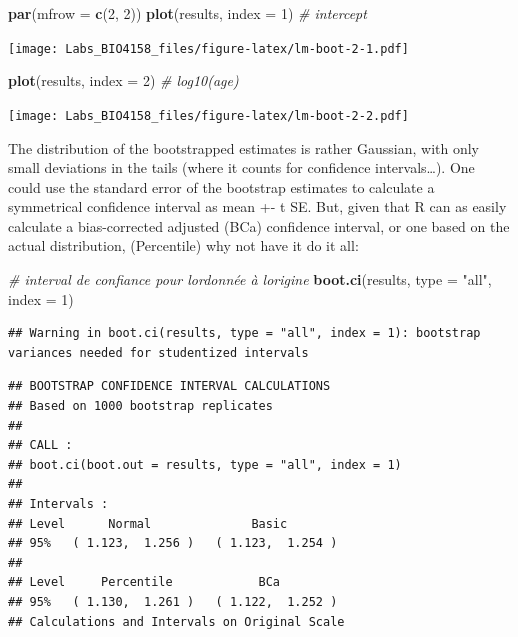 \documentclass[
  12pt,
]{book}
\newenvironment{Shaded}{\begin{snugshade}}{\end{snugshade}}
\newcommand{\CommentTok}[1]{\textcolor[rgb]{0.56,0.35,0.01}{\textit{#1}}}
\newcommand{\DataTypeTok}[1]{\textcolor[rgb]{0.13,0.29,0.53}{#1}}
\newcommand{\DecValTok}[1]{\textcolor[rgb]{0.00,0.00,0.81}{#1}}
\newcommand{\KeywordTok}[1]{\textcolor[rgb]{0.13,0.29,0.53}{\textbf{#1}}}
\newcommand{\NormalTok}[1]{#1}
\newcommand{\StringTok}[1]{\textcolor[rgb]{0.31,0.60,0.02}{#1}}
\begin{document}
\begin{Shaded}
\begin{Highlighting}[]
\KeywordTok{par}\NormalTok{(}\DataTypeTok{mfrow =} \KeywordTok{c}\NormalTok{(}\DecValTok{2}\NormalTok{, }\DecValTok{2}\NormalTok{))}
\KeywordTok{plot}\NormalTok{(results, }\DataTypeTok{index =} \DecValTok{1}\NormalTok{) }\CommentTok{\# intercept}
\end{Highlighting}
\end{Shaded}

\texttt{[image: Labs\_BIO4158\_files/figure-latex/lm-boot-2-1.pdf]}

\begin{Shaded}
\begin{Highlighting}[]
\KeywordTok{plot}\NormalTok{(results, }\DataTypeTok{index =} \DecValTok{2}\NormalTok{) }\CommentTok{\# log10(age)}
\end{Highlighting}
\end{Shaded}

\texttt{[image: Labs\_BIO4158\_files/figure-latex/lm-boot-2-2.pdf]}

The distribution of the bootstrapped estimates is rather Gaussian, with only small deviations in the tails (where it counts for confidence intervals\ldots). One could use the standard error of the bootstrap estimates to calculate a symmetrical confidence interval as mean +- t SE. But, given that R can as easily calculate a bias-corrected adjusted (BCa) confidence interval, or one based on the actual distribution, (Percentile) why not have it do it all:

\begin{Shaded}
\begin{Highlighting}[]
\CommentTok{\# interval de confiance pour l\textquotesingle{}ordonnée à l\textquotesingle{}origine}
\KeywordTok{boot.ci}\NormalTok{(results, }\DataTypeTok{type =} \StringTok{"all"}\NormalTok{, }\DataTypeTok{index =} \DecValTok{1}\NormalTok{)}
\end{Highlighting}
\end{Shaded}

\begin{verbatim}
## Warning in boot.ci(results, type = "all", index = 1): bootstrap variances needed for studentized intervals
\end{verbatim}

\begin{verbatim}
## BOOTSTRAP CONFIDENCE INTERVAL CALCULATIONS
## Based on 1000 bootstrap replicates
## 
## CALL : 
## boot.ci(boot.out = results, type = "all", index = 1)
## 
## Intervals : 
## Level      Normal              Basic         
## 95%   ( 1.123,  1.256 )   ( 1.123,  1.254 )  
## 
## Level     Percentile            BCa          
## 95%   ( 1.130,  1.261 )   ( 1.122,  1.252 )  
## Calculations and Intervals on Original Scale
\end{verbatim}
\end{document}
